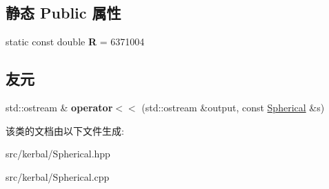 \subsection*{静态 Public 属性}
\begin{DoxyCompactItemize}
\item 
\mbox{\label{classkerbal_1_1spherical_1_1_spherical_a3c7c32b2fd1b013ee1381fc918b9aef0}} 
static const double {\bfseries R} = 6371004
\end{DoxyCompactItemize}
\subsection*{友元}
\begin{DoxyCompactItemize}
\item 
\mbox{\label{classkerbal_1_1spherical_1_1_spherical_a7ee66c61a5ce0d544bb99b4d86e64e45}} 
std\+::ostream \& {\bfseries operator$<$$<$} (std\+::ostream \&output, const \hyperlink{classkerbal_1_1spherical_1_1_spherical}{Spherical} \&s)
\end{DoxyCompactItemize}


该类的文档由以下文件生成\+:\begin{DoxyCompactItemize}
\item 
src/kerbal/Spherical.\+hpp\item 
src/kerbal/Spherical.\+cpp\end{DoxyCompactItemize}
